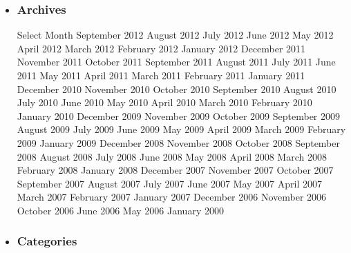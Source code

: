 \begin{itemize}[<+->]
\item
  \subsubsection{Archives}

  Select Month September 2012 August 2012 July 2012 June 2012 May 2012
  April 2012 March 2012 February 2012 January 2012 December 2011
  November 2011 October 2011 September 2011 August 2011 July 2011 June
  2011 May 2011 April 2011 March 2011 February 2011 January 2011
  December 2010 November 2010 October 2010 September 2010 August 2010
  July 2010 June 2010 May 2010 April 2010 March 2010 February 2010
  January 2010 December 2009 November 2009 October 2009 September 2009
  August 2009 July 2009 June 2009 May 2009 April 2009 March 2009
  February 2009 January 2009 December 2008 November 2008 October 2008
  September 2008 August 2008 July 2008 June 2008 May 2008 April 2008
  March 2008 February 2008 January 2008 December 2007 November 2007
  October 2007 September 2007 August 2007 July 2007 June 2007 May 2007
  April 2007 March 2007 February 2007 January 2007 December 2006
  November 2006 October 2006 June 2006 May 2006 January 2000
\item
  \subsubsection{Categories}


\end{itemize}
